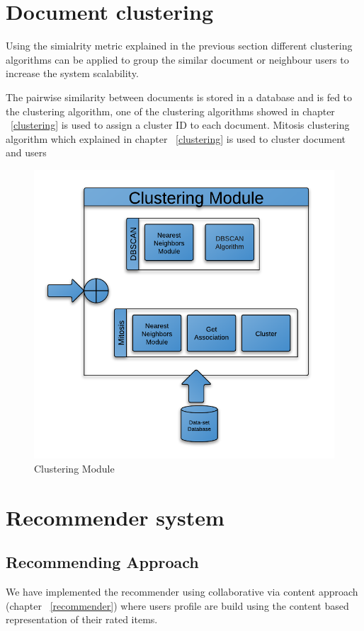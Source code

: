 \section{Document clustering}
Using the simialrity metric explained in the previous section different clustering algorithms can be applied to group the similar document or neighbour users to increase the system scalability.

The pairwise similarity between documents is stored in a database and is fed to the clustering algorithm, one of the clustering algorithms showed in chapter ~\ref{clustering} is used to assign a cluster ID to each document.
Mitosis clustering algorithm which explained in chapter ~\ref{clustering} is used to cluster document and users

\begin{figure}[htb]
\begin{center}
\includegraphics[totalheight=.75\textheight,
width=.75\textwidth]{./Figures/Clustering Module.png}
\end{center}
\caption{Clustering Module}
\label{fig:clustercModule}
\end{figure}

\section{Recommender system}
\subsection{Recommending Approach}
We have implemented the recommender using collaborative via content approach (chapter ~\ref{recommender}) where users profile are build using the content based representation of their rated items.

